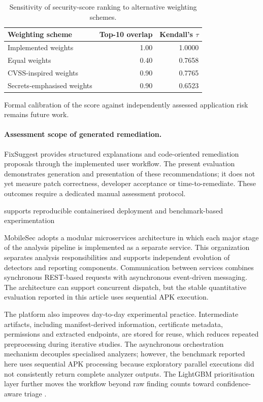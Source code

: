 \begin{table}[H]
\centering
\caption{Sensitivity of security-score ranking to alternative weighting schemes.}
\label{tab:score-sensitivity}
\begin{tabular}{lrr}
\toprule
\textbf{Weighting scheme} & \textbf{Top-10 overlap} & \textbf{Kendall's $\tau$} \\
\midrule
Implemented weights & 1.00 & 1.0000 \\
Equal weights & 0.40 & 0.7658 \\
CVSS-inspired weights & 0.90 & 0.7765 \\
Secrets-emphasised weights & 0.90 & 0.6523 \\
\bottomrule
\end{tabular}
\end{table}

Formal calibration of the score against independently assessed application
risk remains future work.

\paragraph{Assessment scope of generated remediation.}
FixSuggest provides structured explanations and code-oriented remediation
proposals through the implemented user workflow. The present evaluation
demonstrates generation and presentation of these recommendations; it does
not yet measure patch correctness, developer acceptance or time-to-remediate.
These outcomes require a dedicated manual assessment protocol.

supports reproducible containerised deployment and benchmark-based experimentation

MobileSec adopts a modular microservices architecture in which each major
stage of the analysis pipeline is implemented as a separate service. This
organization separates analysis responsibilities and supports independent
evolution of detectors and reporting components. Communication between
services combines synchronous REST-based requests with asynchronous
event-driven messaging. The architecture can support concurrent dispatch, but
the stable quantitative evaluation reported in this article uses sequential
APK execution.

The platform also improves day-to-day experimental practice. Intermediate
artifacts, including manifest-derived information, certificate metadata,
permissions and extracted endpoints, are stored for reuse, which reduces
repeated preprocessing during iterative studies. The asynchronous
orchestration mechanism decouples specialised analyzers; however, the
benchmark reported here uses sequential APK processing because exploratory
parallel executions did not consistently return complete analyzer outputs.
The LightGBM prioritisation layer further moves the workflow beyond raw
finding counts toward confidence-aware triage \cite{ke2017lightgbm}.

